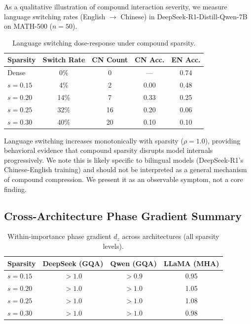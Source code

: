 \documentclass[11pt,a4paper]{article}
\begin{document}
As a qualitative illustration of compound interaction severity, we measure language switching rates (English $\to$ Chinese) in DeepSeek-R1-Distill-Qwen-7B on MATH-500 ($n=50$).

\begin{table}[h]
\centering
\small
\caption{Language switching dose-response under compound sparsity.}
\begin{tabular}{lcccc}
\toprule
Sparsity & Switch Rate & CN Count & CN Acc. & EN Acc. \\
\midrule
Dense & 0\% & 0 & --- & 0.74 \\
$s=0.15$ & 4\% & 2 & 0.00 & 0.48 \\
$s=0.20$ & 14\% & 7 & 0.33 & 0.25 \\
$s=0.25$ & 32\% & 16 & 0.20 & 0.06 \\
$s=0.30$ & 40\% & 20 & 0.10 & 0.10 \\
\bottomrule
\end{tabular}
\label{tab:lang_switch}
\end{table}

Language switching increases monotonically with sparsity ($\rho = 1.0$), providing behavioral evidence that compound sparsity disrupts model internals progressively. We note this is likely specific to bilingual models (DeepSeek-R1's Chinese-English training) and should not be interpreted as a general mechanism of compound compression. We present it as an observable symptom, not a core finding.

\subsection{Cross-Architecture Phase Gradient Summary}

\begin{table}[h]
\centering
\small
\caption{Within-importance phase gradient $d_z$ across architectures (all sparsity levels).}
\begin{tabular}{lccc}
\toprule
Sparsity & DeepSeek (GQA) & Qwen (GQA) & LLaMA (MHA) \\
\midrule
$s=0.15$ & $>1.0$ & $>0.9$ & 0.95 \\
$s=0.20$ & $>1.0$ & $>1.0$ & 1.05 \\
$s=0.25$ & $>1.0$ & $>1.0$ & 1.08 \\
$s=0.30$ & $>1.0$ & $>1.0$ & 0.98 \\
\bottomrule
\end{tabular}
\label{tab:universal_gradient}
\end{table}
\end{document}
